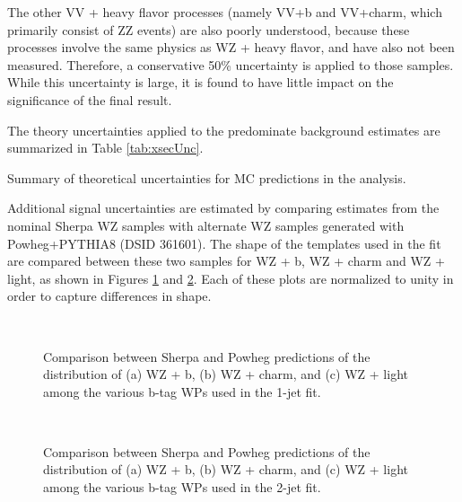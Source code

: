The other VV + heavy flavor processes (namely VV+b and VV+charm, which primarily consist of ZZ events) are also poorly understood, because these processes involve the same physics as WZ + heavy flavor, and have also not been measured. Therefore, a conservative 50\% uncertainty is applied to those samples. While this uncertainty is large, it is found to have little impact on the significance of the final result.

The theory uncertainties applied to the predominate background estimates are summarized in Table \ref{tab:xsecUnc}. 

\begin{table}[H]
{\footnotesize
\centering

\caption{Summary of theoretical uncertainties for MC predictions in the analysis.}
\label{tab:xsecUnc}
}
\end{table}

Additional signal uncertainties are estimated by comparing estimates from the nominal Sherpa WZ samples with alternate WZ samples generated with Powheg+PYTHIA8 (DSID 361601). The shape of the templates used in the fit are compared between these two samples for WZ + b, WZ + charm and WZ + light, as shown in Figures \ref{fig:powheg1j} and \ref{fig:powheg2j}. Each of these plots are normalized to unity in order to capture differences in shape. 

\begin{figure}[H]
    \centering
    \\
    \caption{Comparison between Sherpa and Powheg predictions of the distribution of (a) WZ + b, (b) WZ + charm, and (c) WZ + light among the various b-tag WPs used in the 1-jet fit.}
\label{fig:powheg1j}
\end{figure}

\begin{figure}[H]
    \centering
    \\
    \caption{Comparison between Sherpa and Powheg predictions of the distribution of (a) WZ + b, (b) WZ + charm, and (c) WZ + light among the various b-tag WPs used in the 2-jet fit.}
\label{fig:powheg2j}
\end{figure}

